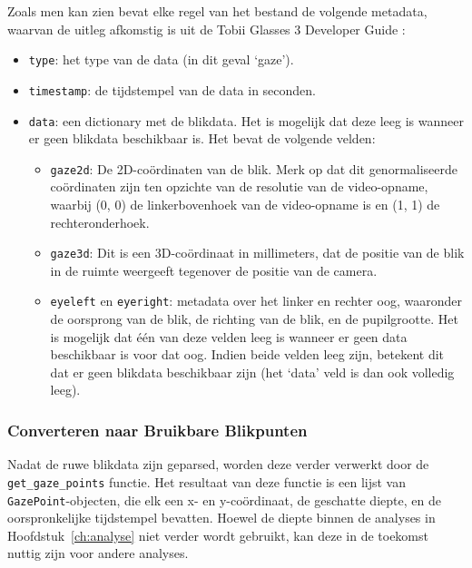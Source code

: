 Zoals men kan zien bevat elke regel van het bestand de volgende metadata, waarvan de uitleg afkomstig is uit de Tobii Glasses 3 Developer Guide \autocite{Tobii2023}:
\begin{itemize}
    \item \texttt{type}: het type van de data (in dit geval `gaze').
    \item \texttt{timestamp}: de tijdstempel van de data in seconden.
    \item \texttt{data}: een dictionary met de blikdata. Het is mogelijk dat deze leeg is wanneer er geen blikdata beschikbaar is. Het bevat de volgende velden:
    \begin{itemize}
      \item \texttt{gaze2d}: De 2D-coördinaten van de blik. Merk op dat dit genormaliseerde coördinaten zijn ten opzichte van de resolutie van de video-opna\-me,
      waarbij (0, 0) de linkerbovenhoek van de video-opname is en (1, 1) de rechteronderhoek.
      \item \texttt{gaze3d}: Dit is een 3D-coördinaat in millimeters, dat de positie van de blik in de ruimte weergeeft tegenover de positie van de camera.
      \item \texttt{eyeleft} en \texttt{eyeright}: metadata over het linker en rechter oog, waaronder de oorsprong van de blik, de richting van de blik, en de pupilgrootte.
      Het is mogelijk dat één van deze velden leeg is wanneer er geen data beschikbaar is voor dat oog. Indien beide velden leeg zijn, betekent dit dat er geen blikdata beschikbaar zijn (het `data' veld is dan ook volledig leeg).
    \end{itemize}
\end{itemize}

\subsubsection{Converteren naar Bruikbare Blikpunten}

Nadat de ruwe blikdata zijn geparsed, worden deze verder verwerkt door de \texttt{get\_\-gaze\_points} functie.
Het resultaat van deze functie is een lijst van \texttt{GazePoint}-objecten, die elk een x- en y-coördinaat, 
de geschatte diepte, en de oorspronkelijke tijdstempel bevatten.
Hoewel de diepte binnen de analyses in Hoofdstuk~\ref{ch:analyse} niet verder wordt gebruikt, kan deze in de 
toekomst nuttig zijn voor andere analyses.

